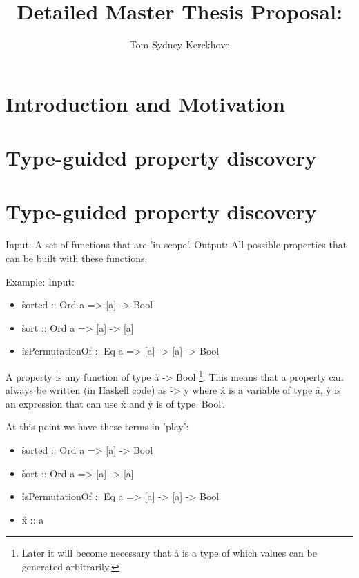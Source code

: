 \documentclass[a4paper, 11pt]{article}
\title{Detailed Master Thesis Proposal:\\\vspace{0.5cm}{\Huge Functional Property Discovery and Corresponding Test Generation in Haskell}}
\author{Tom Sydney Kerckhove}
\begin{document}
\maketitle

\section{Introduction and Motivation}

\newpage

\section{Type-guided property discovery}

\begin{de}
\end{de}

\section{Type-guided property discovery}

Input: A set of functions that are 'in scope'.
Output: All possible properties that can be built with these functions.

Example:
Input: 
\begin{itemize}
  \item \h{sorted :: Ord a => [a] -> Bool}
  \item \h{sort :: Ord a => [a] -> [a]}
  \item \h{isPermutationOf :: Eq a => [a] -> [a] -> Bool}
\end{itemize}

A property is any function of type \h{a -> Bool} \footnote{Later it will become necessary that \h{a} is a type of which values can be generated arbitrarily.}.
This means that a property can always be written (in Haskell code) as \h{\x -> y} where \h{x} is a variable of type \h{a}, \h{y} is an expression that can use \h{x} and \h{y} is of type `Bool`.

At this point we have these terms in 'play':

\begin{itemize}
  \item \h{sorted :: Ord a => [a] -> Bool}
  \item \h{sort :: Ord a => [a] -> [a]}
  \item \h{isPermutationOf :: Eq a => [a] -> [a] -> Bool}
  \item \h{x :: a}
\end{itemize}
\end{document}
